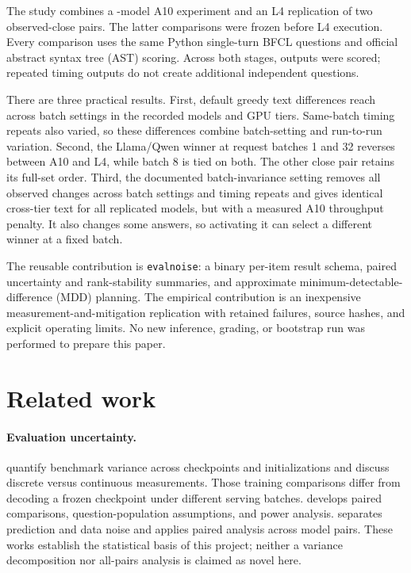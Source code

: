 \documentclass[10pt,twocolumn]{article}
\newcommand{\code}[1]{\texttt{#1}}
\begin{document}
The study combines a \NAtenModels{}-model A10 experiment and an L4 replication of two observed-close pairs. The latter comparisons were frozen before L4 execution. Every comparison uses the same \NItems{} Python single-turn BFCL questions and official abstract syntax tree (AST) scoring. Across both stages, \TotalCount{} outputs were scored; repeated timing outputs do not create additional independent questions.

There are three practical results. First, default greedy text differences reach \TextExact{} across batch settings in the recorded models and GPU tiers. Same-batch timing repeats also varied, so these differences combine batch-setting and run-to-run variation. Second, the Llama/Qwen winner at request batches 1 and 32 reverses between A10 and L4, while batch 8 is tied on both. The other close pair retains its full-set order. Third, the documented batch-invariance setting removes all observed changes across batch settings and timing repeats and gives identical cross-tier text for all replicated models, but with a measured A10 throughput penalty. It also changes some answers, so activating it can select a different winner at a fixed batch.

The reusable contribution is \code{evalnoise}: a binary per-item result schema, paired uncertainty and rank-stability summaries, and approximate minimum-detectable-difference (MDD) planning. The empirical contribution is an inexpensive measurement-and-mitigation replication with retained failures, source hashes, and explicit operating limits. No new inference, grading, or bootstrap run was performed to prepare this paper.

\section{Related work}
\paragraph{Evaluation uncertainty.}
\citet{madaan2024variance} quantify benchmark variance across checkpoints and initializations and discuss discrete versus continuous measurements. Those training comparisons differ from decoding a frozen checkpoint under different serving batches. \citet{miller2024errorbars} develops paired comparisons, question-population assumptions, and power analysis. \citet{wang2025noise} separates prediction and data noise and applies paired analysis across model pairs. These works establish the statistical basis of this project; neither a variance decomposition nor all-pairs analysis is claimed as novel here.
\end{document}
